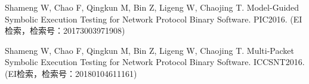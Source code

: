 \begin{resume}
\begin{enumerate}[{[}1{]}]
  \item Shameng W, Chao F, Qingkun M, Bin Z, Ligeng W, Chaojing T. Model-Guided
  Symbolic Execution Testing for Network Protocol Binary Software. PIC2016. (EI
  检索，检索号：20173003971908)
  
  \item Shameng W, Chao F, Qingkun M, Bin Z, Ligeng W, Chaojing T. Multi-Packet
  Symbolic Execution Testing for Network Protocol Binary Software. ICCSNT2016.
  (EI检索，检索号：20180104611161)
  
  
  \end{enumerate}
%    
%    
%    
%    
%    
%      
%    
%    
%    
%    
%    
%    


\end{resume}
